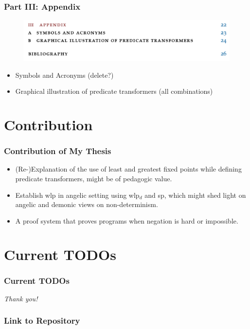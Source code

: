 \documentclass[aspectratio=169]{beamer}
\begin{document}
\begin{frame}[fragile]
	\frametitle{Part III: Appendix}
	\begin{minipage}[t]{0.49\linewidth}	
		\begin{figure}
			\centering \includegraphics[width=1.05\textwidth]{images/part3.png} 
		\end{figure}
	\end{minipage}
	\begin{minipage}[t]{0.49\linewidth}
		\begin{itemize}
			\item Symbols and Acronyms (delete?)
			\item Graphical illustration of predicate transformers (all combinations)
		\end{itemize}
	\end{minipage}
\end{frame}

\section{Contribution }

\begin{frame}[fragile]
	\frametitle{Contribution of My Thesis}
	\begin{itemize}
	    \item (Re-)Explanation of the use of least and greatest fixed points while defining predicate transformers, might be of pedagogic value. 
	    \item Establish wlp in angelic setting using wlp$_d$ and sp, which might shed light on angelic and demonic views on non-determinism. 
	    \item A proof system that proves programs when negation is hard or impossible. 
	\end{itemize}
\end{frame}

\section{Current TODOs }

\begin{frame}
	\frametitle{Current TODOs}
	
	\vspace{10mm}
	\Large
	\hfill\textit{Thank you!}
\end{frame}

\begin{frame}
	\frametitle{Link to Repository}
	
	\nocite{*}
	
\end{frame}
\end{document}
